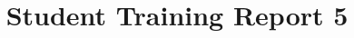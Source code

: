 \documentclass[10pt,journal,compsoc]{IEEEtran}
\begin{document}
\title{Student Training Report 5}

\maketitle
\IEEEdisplaynontitleabstractindextext
\IEEEpeerreviewmaketitle
\end{document}
